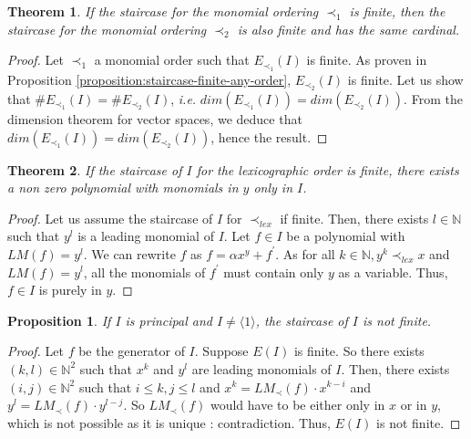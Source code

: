 \documentclass{article}
\newtheorem{theorem}{Theorem}[section]
\newtheorem{proposition}{Proposition}[section]
\begin{document}
\begin{theorem}
    If the staircase for the monomial ordering $\prec_{1}$ is finite, then the staircase for the monomial ordering $\prec_{2}$ is also finite and has the same cardinal.
\end{theorem}

\begin{proof}
    Let $\prec_{1}$ a monomial order such that $E_{\prec_{1}}(I)$ is finite. As proven in Proposition \ref{proposition:staircase-finite-any-order}, $E_{\prec_{2}}(I)$ is finite. Let us show that $\# E_{\prec_{1}}(I) = \# E_{\prec_{2}}(I)$, \textit{i.e.} $dim(E_{\prec_{1}}(I)) = dim(E_{\prec_{2}}(I))$. From the dimension theorem for vector spaces, we deduce that $dim(E_{\prec_{1}}(I)) = dim(E_{\prec_{2}}(I))$, hence the result.
\end{proof}

\begin{theorem}
    If the staircase of $I$ for the lexicographic order is finite, there exists a non zero polynomial with monomials in $y$ only in $I$.
\end{theorem}

\begin{proof}
    Let us assume the staircase of $I$ for $\prec_{lex}$ if finite. Then, there exists $l \in \mathbb{N}$ such that $y^{l}$ is a leading monomial of $I$. Let $f \in I$ be a polynomial with $LM(f) = y^{l}$. We can rewrite $f$ as $f = \alpha x^{y} + f^{\prime}$. As for all $k \in \mathbb{N}, y^{k} \prec_{lex} x$ and $LM(f) = y^{l}$, all the monomials of $f^{\prime}$ must contain only $y$ as a variable. Thus,  $f \in I$ is purely in $y$.
\end{proof}

\begin{proposition}
    If $I$ is principal and $I \neq \langle 1 \rangle$, the staircase of $I$ is not finite. 
\end{proposition}

\begin{proof}
    Let $f$ be the generator of $I$. Suppose $E(I)$ is finite. So there exists $(k, l) \in \mathbb{N}^{2}$ such that $x^{k}$ and $y^{l}$ are leading monomials of $I$. Then, there exists $(i, j) \in \mathbb{N}^{2}$ such that $i \leq k, j \leq l$ and $x^{k} = LM_{\prec}(f) \cdot x^{k - i}$ and $y^{l} = LM_{\prec}(f) \cdot y^{l - j}$. So $LM_{\prec}(f)$ would have to be either only in $x$ or in $y$, which is not possible as it is unique : contradiction. Thus, $E(I)$ is not finite. 
\end{proof}
\end{document}
